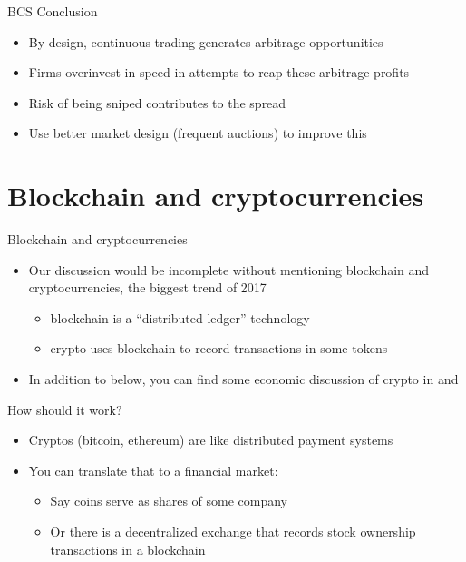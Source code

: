\documentclass[english,10pt
,aspectratio=169
]{beamer}
\begin{document}
\begin{frame}{BCS Conclusion}
	\begin{itemize}
		\item By design, continuous trading generates arbitrage opportunities
		\item Firms overinvest in speed in attempts to reap these arbitrage profits
		\item Risk of being sniped contributes to the spread
		\item Use better market design (frequent auctions) to improve this
	\end{itemize}
\end{frame}



\section{Blockchain and cryptocurrencies}

\begin{frame}{Blockchain and cryptocurrencies}
	\begin{itemize}
		\item Our discussion would be incomplete without mentioning \alert{blockchain} and \alert{cryptocurrencies}, the biggest trend of 2017
		\begin{itemize}
			\item blockchain is a ``distributed ledger'' technology
			\item crypto uses blockchain to record transactions in some tokens
		\end{itemize}
		\item In addition to below, you can find some economic discussion of crypto in \citet*{nica_cryptocurrencies_2017} and \citet*{halaburda_microeconomics_2020}
	\end{itemize}
\end{frame}


\begin{frame}{How should it work?}
	\begin{itemize}
		\item Cryptos (bitcoin, ethereum) are like distributed payment systems
		\item You can translate that to a financial market:
		\begin{itemize}
			\item Say coins serve as shares of some company
			\item Or there is a decentralized exchange that records stock ownership transactions in a blockchain
		\end{itemize}
	\end{itemize}
\end{frame}
\end{document}
